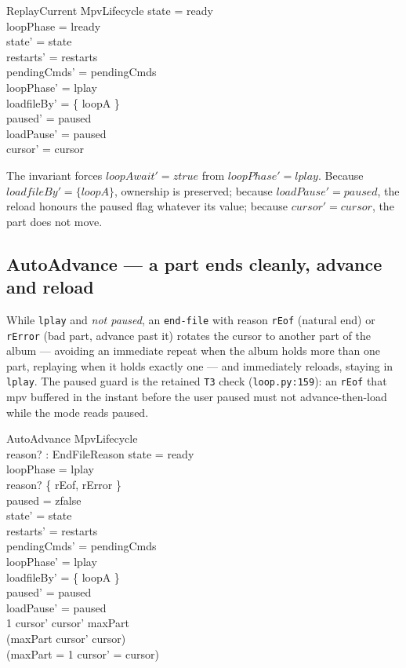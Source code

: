 \documentclass[a4paper,10pt,fleqn]{article}
\begin{document}
\begin{schema}{ReplayCurrent}
  \Delta MpvLifecycle
  \where
  state = ready \\
  loopPhase = lready \\
  state' = state \\
  restarts' = restarts \\
  pendingCmds' = pendingCmds \\
  loopPhase' = lplay \\
  loadfileBy' = \{ loopA \} \\
  paused' = paused \\
  loadPause' = paused \\
  cursor' = cursor
\end{schema}

The invariant forces $loopAwait' = ztrue$ from $loopPhase' = lplay$. Because
$loadfileBy' = \{ loopA \}$, ownership is preserved; because $loadPause' =
paused$, the reload honours the paused flag whatever its value; because
$cursor' = cursor$, the part does not move.

\subsection{AutoAdvance --- a part ends cleanly, advance and reload}
\label{sec:autoadvance}

While \texttt{lplay} and \emph{not paused}, an \texttt{end-file} with reason
\texttt{rEof} (natural end) or \texttt{rError} (bad part, advance past it)
rotates the cursor to another part of the album --- avoiding an immediate
repeat when the album holds more than one part, replaying when it holds exactly
one --- and immediately reloads, staying in \texttt{lplay}. The paused guard is
the retained \texttt{T3} check (\texttt{loop.py:159}): an \texttt{rEof} that mpv
buffered in the instant before the user paused must not advance-then-load while
the mode reads paused.

\begin{schema}{AutoAdvance}
  \Delta MpvLifecycle \\
  reason? : EndFileReason
  \where
  state = ready \\
  loopPhase = lplay \\
  reason? \in \{ rEof, rError \} \\
  paused = zfalse \\
  state' = state \\
  restarts' = restarts \\
  pendingCmds' = pendingCmds \\
  loopPhase' = lplay \\
  loadfileBy' = \{ loopA \} \\
  paused' = paused \\
  loadPause' = paused \\
  1 \leq cursor' \land cursor' \leq maxPart \\
  (maxPart  \implies cursor' \neq cursor) \\
  (maxPart = 1 \implies cursor' = cursor)
\end{schema}
\end{document}

